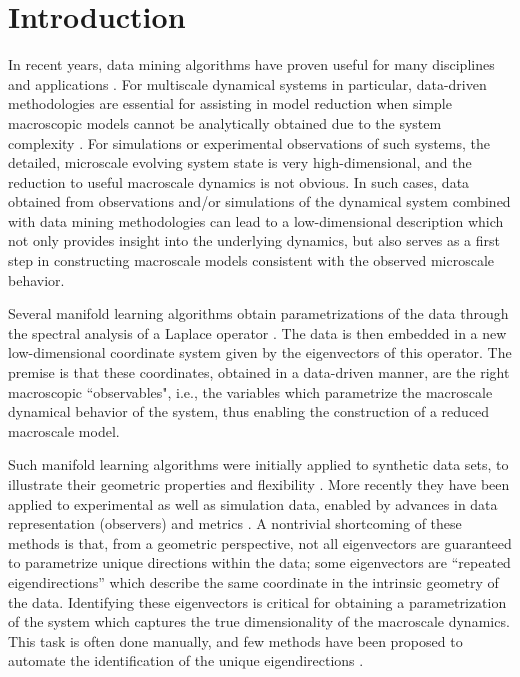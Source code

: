 \documentclass[3p]{elsarticle}
\begin{document}
\section{Introduction}

In recent years, data mining algorithms have proven useful for many disciplines and applications \cite{gepshtein2013image, fernandez2014diffusion, singer2011viewing, yuan2014automated, zhao2003face, trapnell2014dynamics, kemelmacher2011exploring, sifre2013rotation}.
%
For multiscale dynamical systems in particular, data-driven methodologies are essential for
assisting in model reduction when simple macroscopic models cannot be analytically obtained
due to the system complexity \cite{talmon2014intrinsic,berry2013time,singer2009detecting,ferguson2010systematic}.
%
For simulations or experimental observations of such systems, the detailed, microscale evolving system state is
very high-dimensional, and the reduction to useful macroscale dynamics is not obvious.
%
In such cases, data obtained from observations and/or simulations of the dynamical system combined with
data mining methodologies can lead to a low-dimensional description which not only provides insight into the underlying dynamics, but also serves as a first step in constructing macroscale models consistent with the observed microscale behavior.

%
Several manifold learning algorithms obtain parametrizations of the data through
the spectral analysis of a Laplace operator \cite{Belkin2003,coifman2005geometric,coifman2006geometric,singer2008non}.
%
The data is then embedded in a new low-dimensional coordinate system
given by the eigenvectors of this operator.
%
The premise is that these coordinates, obtained in a data-driven manner, are the right macroscopic ``observables", i.e., 
the variables which parametrize the macroscale dynamical behavior of the system, thus enabling the construction of a reduced macroscale model.

Such manifold learning algorithms were initially applied to synthetic data sets, to illustrate
their geometric properties and flexibility \cite{coifman2005geometric, nadler2006diffusion}.
%
More recently they have been applied to experimental as well as simulation data,
enabled by advances in data representation (observers) and
metrics \cite{rubner2000earth,mallat2012group,talmon2013empirical,zhao2014rotationally, rohrdanz2011determination, talmon2015manifold}.
%
A nontrivial shortcoming of these methods is that, from a geometric perspective,
not all eigenvectors are guaranteed to parametrize unique directions within the data;
some eigenvectors are ``repeated eigendirections'' which describe the same coordinate in the intrinsic geometry
of the data.
%
Identifying these eigenvectors is critical for obtaining a
parametrization of the system which captures the true dimensionality of the macroscale dynamics.
%
This task is often done manually, and few methods have been proposed to automate the identification of the unique eigendirections \cite{gerber2007robust}.
\end{document}
